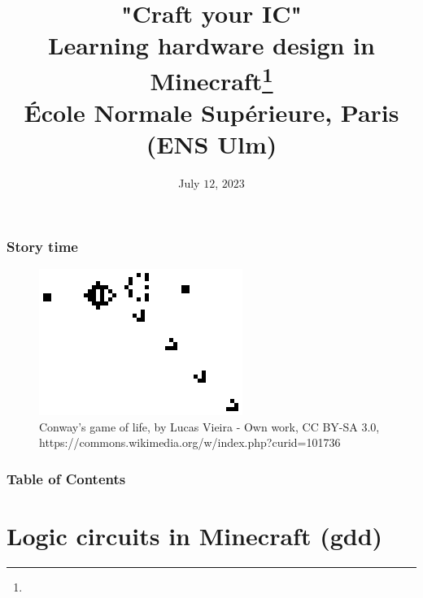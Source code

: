 \documentclass[aspectratio=169]{beamer}
\title{"Craft your IC"\\Learning hardware design in
Minecraft\footnote{\tiny{}\reproduce}\\\small{} École Normale Supérieure, Paris (ENS Ulm)}
\author{\names}
\institute{FSiC $2023$}
\date{July $12$, $2023$}
\begin{document}
\beamertemplatenavigationsymbolsempty
{}

\maketitle

\begin{frame}[fragile]
	\frametitle{Story time}
	\begin{figure}
		\includegraphics[width=.5\textwidth]{imgs/game_of_life.png}
		\caption*{Conway's game of life, by Lucas Vieira - Own work, CC BY-SA 3.0, https://commons.wikimedia.org/w/index.php?curid=101736}
	\end{figure}

\end{frame}

\begin{frame}[fragile]
	\frametitle{Table of Contents}
	\tableofcontents
\end{frame}

\section{Logic circuits in Minecraft (gdd)}

 {
  \begin{frame}[plain]
  \end{frame}
 }
\end{document}
